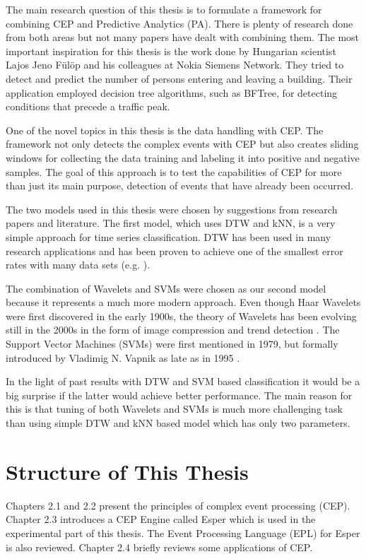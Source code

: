 The main research question of this thesis is to formulate a framework for combining CEP and Predictive Analytics (PA). There is plenty of research done from both areas but not many papers have dealt with combining them. The most important inspiration for this thesis is the work done by Hungarian scientist Lajos Jeno F\"ul\"op and his colleagues at Nokia Siemens Network. They tried to detect and predict the number of persons entering and leaving a building. Their application employed decision tree algorithms, such as BFTree, for detecting conditions that precede a traffic peak. \cite{Fulop12}

One of the novel topics in this thesis is the data handling with CEP. The framework not only detects the complex events with CEP but also creates sliding windows for collecting the data training and labeling it into positive and negative samples. The goal of this approach is to test the capabilities of CEP for more than just its main purpose, detection of events that have already been occurred.

The two models used in this thesis were chosen by suggestions from research papers and literature. The first model, which uses DTW and kNN, is a very simple approach for time series classification. DTW has been used in many research applications and has been proven to achieve one of the smallest error rates with many data sets (e.g. \cite{keogh05}).

The combination of Wavelets and SVMs were chosen as our second model because it represents a much more modern approach. Even though Haar Wavelets were first discovered in the early 1900s, the theory of Wavelets has been evolving still in the 2000s in the form of image compression and trend detection \cite{waisberg11}. The Support Vector Machines (SVMs) were first mentioned in 1979, but formally introduced by Vladimig N. Vapnik as late as in 1995 \cite{bosswell02}.

In the light of past results with DTW and SVM based classification it would be a big surprise if the latter would achieve better performance. \cite{keogh05} \cite{Hautakangas11} The main reason for this is that tuning of both Wavelets and SVMs is much more challenging task than using simple DTW and kNN based model which has only two parameters.




\section{Structure of This Thesis}
Chapters 2.1 and 2.2 present the principles of complex event processing (CEP). Chapter 2.3 introduces a CEP Engine called Esper which is used in the experimental part of this thesis. The Event Processing Language (EPL) for Esper is also reviewed. Chapter 2.4 briefly reviews some applications of CEP.

